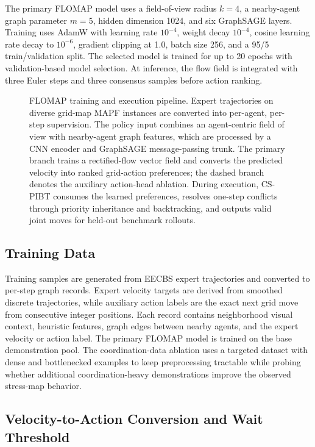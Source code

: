 \documentclass[conference]{IEEEtran}
\begin{document}
The primary FLOMAP model uses a field-of-view radius $k=4$, a nearby-agent
graph parameter $m=5$, hidden dimension 1024, and six GraphSAGE layers.  Training
uses AdamW with learning rate $10^{-4}$, weight decay $10^{-4}$, cosine learning
rate decay to $10^{-6}$, gradient clipping at 1.0, batch size 256, and a 95/5
train/validation split.
The selected model is trained for up to 20 epochs with validation-based model
selection.  At inference, the flow field is integrated with three Euler steps
and three consensus samples before action ranking.

\begin{figure}[!tbp]
\centering
\resizebox{0.96\textwidth}{!}{}
\caption{FLOMAP training and execution pipeline.  Expert trajectories on
diverse grid-map MAPF instances are converted into per-agent, per-step
supervision.  The policy input combines an agent-centric field of view with
nearby-agent graph features, which are processed by a CNN encoder and GraphSAGE
message-passing trunk.  The primary branch trains a rectified-flow vector field
and converts the predicted velocity into ranked grid-action preferences; the
dashed branch denotes the auxiliary action-head ablation.  During execution,
CS-PIBT consumes the learned preferences, resolves one-step conflicts through
priority inheritance and backtracking, and outputs valid joint moves for
held-out benchmark rollouts.}
\label{fig:architecture}
\end{figure}

\subsection{Training Data}

Training samples are generated from EECBS expert trajectories and converted to
per-step graph records.  Expert velocity targets are derived from smoothed
discrete trajectories, while auxiliary action labels are the exact next grid
move from consecutive integer positions.  Each record contains neighborhood
visual context, heuristic features, graph edges between nearby agents, and the
expert velocity or action label.  The primary FLOMAP model is trained on the base
demonstration pool.  The coordination-data ablation uses a targeted
dataset with dense and bottlenecked examples to keep preprocessing tractable
while probing whether additional coordination-heavy demonstrations improve the
observed stress-map behavior.

\subsection{Velocity-to-Action Conversion and Wait Threshold}
\end{document}
